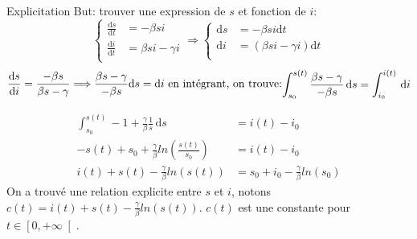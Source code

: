 \documentclass{beamer}
\theoremstyle{plain}
\theoremstyle{definition}
\theoremstyle{remark}
\begin{document}
\begin{frame}{Explicitation}
But: trouver une expression de $s$ et fonction de $i$:
\begin{equation*}
\left\{
     \begin{aligned}
    \frac{\mathrm{d}s}{\mathrm{d}t} &= -\beta si\\
    \frac{\mathrm{d}i}{\mathrm{d}t} &= \beta si -\gamma i\\
    \end{aligned}
\right.
\Longrightarrow
\left\{
    \begin{aligned}
    \mathrm{d}s &= -\beta si \mathrm{d}t\\
    \mathrm{d}i &= \left(\beta si -\gamma i \right)\mathrm{d}t\\
    \end{aligned}
    \right.
    \end{equation*}
    \newline
    \begin{equation*}

    \begin{aligned}
    \frac{\mathrm{d}s}{\mathrm{d}i} = \frac{-\beta s}{\beta s-\gamma} \\
    \end{aligned}
    \Longrightarrow
    \begin{aligned}
    \frac{\beta s-\gamma}{-\beta s}\mathrm{d}s=\mathrm{d}i
        \end{aligned}\\
  \text{ en intégrant, on trouve:}
    \begin{aligned}
   \int_{s_0}^{s(t)} \frac{\beta s-\gamma}{-\beta s} \, \mathrm{d}s&=\int_{i_0}^{i(t)}\, \mathrm{d}i \\
   \end{aligned}
 
   \end{equation*}
   \end{frame}
   \begin{frame}
   \begin{equation*}
         \begin{aligned}
    \int_{s_0}^{s(t)} -1+\frac{\gamma}{\beta}\frac{1}{s}\, \mathrm{d}s&=i(t)-i_0\\
        -s(t)+s_0+\frac{\gamma}{\beta}ln(\frac{s(t)}{s_0})&=i(t)-i_0\\
    i(t)+s(t)-\frac{\gamma}{\beta}ln(s(t))&=s_0+i_0-\frac{\gamma}{\beta}ln(s_0)
   \end{aligned}
   \end{equation*}
   On a trouvé une relation explicite entre $s$ et $i$, notons $c(t)=i(t)+s(t)-\frac{\gamma}{\beta}ln(s(t))$. $c(t)$ est une constante pour $t\in\left[0,+\infty\right[$. \\
   
\end{frame}
\end{document}
